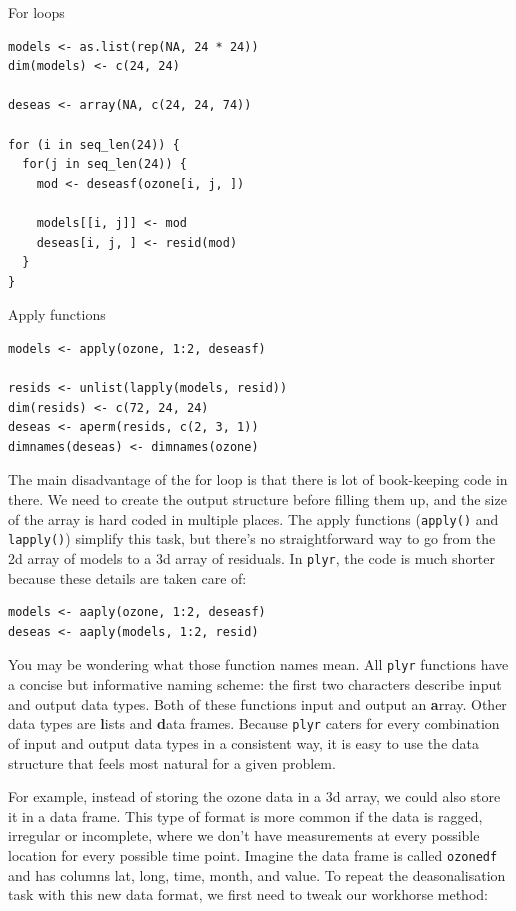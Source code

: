 \documentclass{scrartcl}
\newcommand{\code}[1]{\lstinline!#1!}
\newcommand{\f}[1]{\lstinline!#1()!}
\newcommand{\plyr}{{\tt plyr}\xspace}
\begin{document}
\raggedcolumns
\begin{multicols}{2}

\noindent For loops
\begin{verbatim}
models <- as.list(rep(NA, 24 * 24))
dim(models) <- c(24, 24)

deseas <- array(NA, c(24, 24, 74))

for (i in seq_len(24)) {
  for(j in seq_len(24)) {
    mod <- deseasf(ozone[i, j, ])

    models[[i, j]] <- mod
    deseas[i, j, ] <- resid(mod)
  }
}

\end{verbatim}
\columnbreak

\noindent Apply functions
\begin{verbatim}
models <- apply(ozone, 1:2, deseasf)

resids <- unlist(lapply(models, resid))
dim(resids) <- c(72, 24, 24)
deseas <- aperm(resids, c(2, 3, 1))
dimnames(deseas) <- dimnames(ozone)
\end{verbatim}
\end{multicols}

The main disadvantage of the for loop is that there is lot of book-keeping code in there.  We need to create the output structure before filling them up, and the size of the array is hard coded in multiple places.  The apply functions (\f{apply} and \f{lapply}) simplify this task, but there's no straightforward way to go from the 2d array of models to a 3d array of residuals. In \plyr, the code is much shorter because these details are taken care of:

\begin{verbatim}
models <- aaply(ozone, 1:2, deseasf)
deseas <- aaply(models, 1:2, resid)
\end{verbatim}

You may be wondering what those function names mean.  All \plyr functions have a concise but informative naming scheme: the first two characters describe input and output data types.  Both of these functions input and output an {\bf a}rray.  Other data types are {\bf l}ists and {\bf d}ata frames.  Because \plyr caters for every combination of input and output data types in a consistent way, it is easy to use the data structure that feels most natural for a given problem.

For example, instead of storing the ozone data in a 3d array, we could also store it in a data frame.  This type of format is more common if the data is ragged, irregular or incomplete, where we don't have measurements at every possible location for every possible time point.  Imagine the data frame is called \code{ozonedf} and has columns lat, long, time, month, and value.  To repeat the deasonalisation task with this new data format, we first need to tweak our workhorse method:
\end{document}
